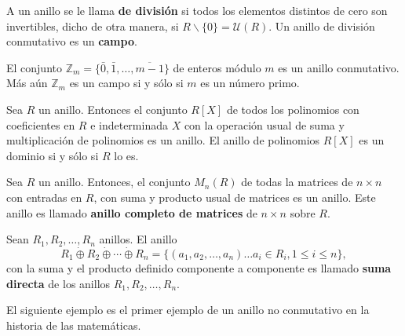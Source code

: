 A un anillo se le llama \textbf{de división} si todos los elementos distintos de cero son invertibles, dicho de otra manera, si $R\backslash \{0\} = \mathcal{U}(R)$. Un anillo de división conmutativo es un \textbf{campo}.
\begin{ejemplo}
El conjunto $\mathds{Z}_m = \{ \bar{0}, \bar{1}, \dots, \overline{m-1} \}$ de enteros módulo $m$ es un anillo conmutativo. Más aún $\mathds{Z}_m$ es un campo si y sólo si $m$ es un número primo.
\end{ejemplo}
\begin{ejemplo}
Sea $R$ un anillo. Entonces el conjunto $R[X]$ de todos los polinomios con coeficientes en $R$ e indeterminada  $X$ con la operación usual de suma y multiplicación de polinomios es un anillo. El anillo de polinomios $R[X]$ es un dominio si y sólo si $R$ lo es. 
\end{ejemplo}
\begin{ejemplo}
Sea $R$ un anillo. Entonces, el conjunto $M_n(R)$ de todas la matrices de $n\times n$ con entradas en $R$, con suma y producto usual de matrices es un anillo. Este anillo es llamado \textbf{anillo completo de matrices} de $n\times n$ sobre $R$.
\end{ejemplo}
\begin{ejemplo}
Sean $R_1, R_2, \dots, R_n$ anillos. El anillo \[ R_1\dot{\oplus}R_2\dot{\oplus}\cdots\dot{\oplus} R_n = \{ (a_1,a_2,\dots,a_n) \dots a_i \in R_i, 1\leq i \leq n \},  \] con la suma y el producto definido componente a componente es llamado  \textbf{suma directa} de los anillos $R_1, R_2,\dots,R_n$.
\end{ejemplo}
El siguiente ejemplo es el primer ejemplo de un anillo no conmutativo en la historia de las matemáticas. 

